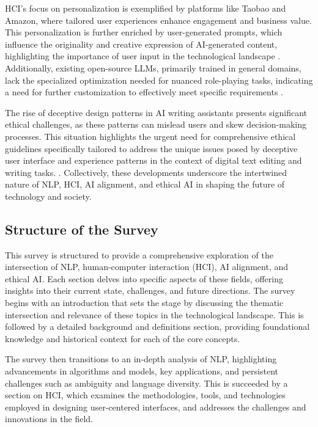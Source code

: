 HCI's focus on personalization is exemplified by platforms like Taobao and Amazon, where tailored user experiences enhance engagement and business value. This personalization is further enriched by user-generated prompts, which influence the originality and creative expression of AI-generated content, highlighting the importance of user input in the technological landscape \cite{palmini2024patternscreativityuserinput}. Additionally, existing open-source LLMs, primarily trained in general domains, lack the specialized optimization needed for nuanced role-playing tasks, indicating a need for further customization to effectively meet specific requirements \cite{tao2024rolecraftglmadvancingpersonalizedroleplaying}.



The rise of deceptive design patterns in AI writing assistants presents significant ethical challenges, as these patterns can mislead users and skew decision-making processes. This situation highlights the urgent need for comprehensive ethical guidelines specifically tailored to address the unique issues posed by deceptive user interface and experience patterns in the context of digital text editing and writing tasks. \cite{benharrak2024deceptivepatternsintelligentinteractive}. Collectively, these developments underscore the intertwined nature of NLP, HCI, AI alignment, and ethical AI in shaping the future of technology and society.



\subsection{Structure of the Survey} \label{subsec:Structure of the Survey}

This survey is structured to provide a comprehensive exploration of the intersection of NLP, human-computer interaction (HCI), AI alignment, and ethical AI. Each section delves into specific aspects of these fields, offering insights into their current state, challenges, and future directions. The survey begins with an introduction that sets the stage by discussing the thematic intersection and relevance of these topics in the technological landscape. This is followed by a detailed background and definitions section, providing foundational knowledge and historical context for each of the core concepts.



The survey then transitions to an in-depth analysis of NLP, highlighting advancements in algorithms and models, key applications, and persistent challenges such as ambiguity and language diversity. This is succeeded by a section on HCI, which examines the methodologies, tools, and technologies employed in designing user-centered interfaces, and addresses the challenges and innovations in the field.




